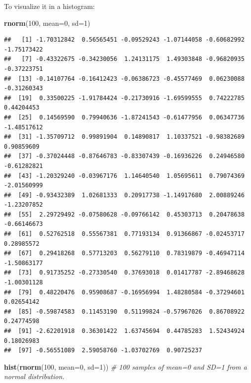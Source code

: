 \documentclass[
]{article}
\newenvironment{Shaded}{\begin{snugshade}}{\end{snugshade}}
\newcommand{\CommentTok}[1]{\textcolor[rgb]{0.56,0.35,0.01}{\textit{#1}}}
\newcommand{\DataTypeTok}[1]{\textcolor[rgb]{0.13,0.29,0.53}{#1}}
\newcommand{\DecValTok}[1]{\textcolor[rgb]{0.00,0.00,0.81}{#1}}
\newcommand{\KeywordTok}[1]{\textcolor[rgb]{0.13,0.29,0.53}{\textbf{#1}}}
\newcommand{\NormalTok}[1]{#1}
\begin{document}
To visualize it in a histogram:

\begin{Shaded}
\begin{Highlighting}[]
\KeywordTok{rnorm}\NormalTok{(}\DecValTok{100}\NormalTok{, }\DataTypeTok{mean=}\DecValTok{0}\NormalTok{, }\DataTypeTok{sd=}\DecValTok{1}\NormalTok{)}
\end{Highlighting}
\end{Shaded}

\begin{verbatim}
##   [1] -1.70312842  0.56565451 -0.09529243 -1.07144058 -0.60682992 -1.75173422
##   [7] -0.43322675 -0.34230056  1.24131175  1.49303848 -0.96820935 -0.37223751
##  [13] -0.14107764 -0.16412423 -0.06386723 -0.45577469  0.06230088 -0.31260343
##  [19]  0.33500225 -1.91784424 -0.21730916 -1.69599555  0.74222785  0.44204453
##  [25]  0.14569590  0.79940636 -1.87241543 -0.61477956  0.06347736 -1.48517612
##  [31] -1.35709712  0.99891904  0.14890817  1.10337521 -0.98382689  0.90859609
##  [37] -0.37024448 -0.87646783 -0.83307439 -0.16936226  0.24946580 -0.61282821
##  [43] -1.20329240 -0.03967176  1.14640540  1.05695611  0.79074369 -2.01560999
##  [49] -0.93432389  1.02681333  0.20917738 -1.14917680  2.00889246 -1.23207852
##  [55]  2.29729492 -0.07580628 -0.09766142  0.45303713  0.20478638 -0.66146673
##  [61]  0.52762518  0.55567381  0.77193134  0.91366867 -0.02453717  0.28985572
##  [67]  0.29418268  0.57713203  0.56279110  0.78319879 -0.46947114 -1.50863177
##  [73]  0.91735252 -0.27330540  0.37693018  0.01417787 -2.89468628 -1.00301128
##  [79]  0.48220476  0.95908687 -0.16956994  1.48280584 -0.37294601  0.02654142
##  [85] -0.59874583  0.11453190  0.51199824 -0.57967026  0.86708922  0.24774598
##  [91] -2.62201918  0.36301422  1.63745694  0.44785283  1.52434924  0.18026983
##  [97] -0.56551089  2.59058760 -1.03702769  0.90725237
\end{verbatim}

\begin{Shaded}
\begin{Highlighting}[]
\KeywordTok{hist}\NormalTok{(}\KeywordTok{rnorm}\NormalTok{(}\DecValTok{100}\NormalTok{, }\DataTypeTok{mean=}\DecValTok{0}\NormalTok{, }\DataTypeTok{sd=}\DecValTok{1}\NormalTok{)) }\CommentTok{# 100 samples of mean=0 and SD=1 from a normal distribution.}
\end{Highlighting}
\end{Shaded}
\end{document}
